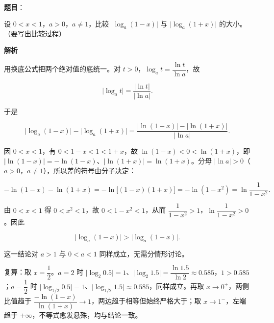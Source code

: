 \begin{answer}

\textbf{题目}：

设 $0<x<1$，$a>0$，$a\ne1$，比较 $\lvert\log_a(1-x)\rvert$ 与 $\lvert\log_a(1+x)\rvert$ 的大小。（要写出比较过程）

\textbf{解析}

用换底公式把两个绝对值的底统一。对 $t>0$，$\log_a t=\dfrac{\ln t}{\ln a}$，故

\nopagebreak[4]
\[
\lvert\log_a t\rvert=\frac{\lvert\ln t\rvert}{\lvert\ln a\rvert}.
\]

于是

\nopagebreak[4]
\[
\lvert\log_a(1-x)\rvert-\lvert\log_a(1+x)\rvert
=\frac{\lvert\ln(1-x)\rvert-\lvert\ln(1+x)\rvert}{\lvert\ln a\rvert}.
\]

因 $0<x<1$，有 $0<1-x<1<1+x$，故 $\ln(1-x)<0<\ln(1+x)$，即 $\lvert\ln(1-x)\rvert=-\ln(1-x)$、$\lvert\ln(1+x)\rvert=\ln(1+x)$。分母 $\lvert\ln a\rvert>0$（$a>0$，$a\ne1$），所以差的符号由分子决定：

\nopagebreak[4]
\[
-\ln(1-x)-\ln(1+x)=-\ln\bigl[(1-x)(1+x)\bigr]=-\ln(1-x^2)=\ln\frac1{1-x^2}.
\]

由 $0<x<1$ 得 $0<x^2<1$，故 $0<1-x^2<1$，从而 $\dfrac1{1-x^2}>1$，$\ln\dfrac1{1-x^2}>0$。因此

\nopagebreak[4]
\[
\lvert\log_a(1-x)\rvert>\lvert\log_a(1+x)\rvert.
\]

这一结论对 $a>1$ 与 $0<a<1$ 同样成立，无需分情形讨论。

复算：取 $x=\dfrac12$。$a=2$ 时 $\lvert\log_2 0.5\rvert=1$、$\lvert\log_2 1.5\rvert=\dfrac{\ln1.5}{\ln2}\approx0.585$，$1>0.585$；$a=\dfrac12$ 时 $\lvert\log_{1/2}0.5\rvert=1$、$\lvert\log_{1/2}1.5\rvert\approx0.585$，同样成立。再取 $x\to0^+$，两侧比值趋于 $\dfrac{-\ln(1-x)}{\ln(1+x)}\to1$，两边趋于相等但始终严格大于；取 $x\to1^-$，左端趋于 $+\infty$，不等式愈发悬殊，均与结论一致。


\end{answer}
